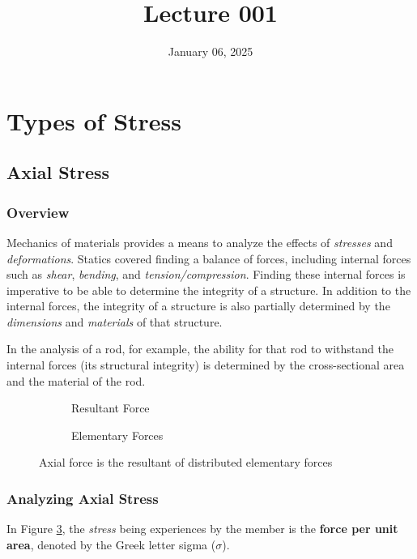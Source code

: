 \documentclass[12pt]{article}
\title{Lecture 001}
\date{January 06, 2025}
\begin{document}
\section{Types of Stress}
\label{sec:typesOfStress}

\subsection{Axial Stress}
\label{ssec:axialStress}

\subsubsection{Overview}
\label{sssec:overview}

Mechanics of materials provides a means to analyze the effects of \textit{stresses} and \textit{deformations}. Statics covered finding a balance of forces, including internal forces such as \textit{shear}, \textit{bending}, and \textit{tension/compression}. Finding these internal forces is imperative to be able to determine the integrity of a structure. In addition to the internal forces, the integrity of a structure is also partially determined by the \textit{dimensions} and \textit{materials} of that structure.

In the analysis of a rod, for example, the ability for that rod to withstand the internal forces (its structural integrity) is determined by the cross-sectional area and the material of the rod.

\begin{figure}[H]
  \centering
  \begin{subfigure}[H]{0.45\textwidth}
    \centering
    
    \caption{Resultant Force}
    \label{fig:001}
  \end{subfigure}
  \begin{subfigure}[H]{0.45\textwidth}
    \centering
    
    \caption{Elementary Forces}
    \label{fig:002}
  \end{subfigure}
  \caption{Axial force is the resultant of distributed elementary forces}
  \label{fig:axialVsElementary}
\end{figure}

\subsubsection{Analyzing Axial Stress}
\label{sssec:analyzingAxialStress}

In Figure \ref{fig:axialVsElementary}, the \textit{stress} being experiences by the member is the \textbf{force per unit area}, denoted by the Greek letter sigma ($\sigma$).
\end{document}
